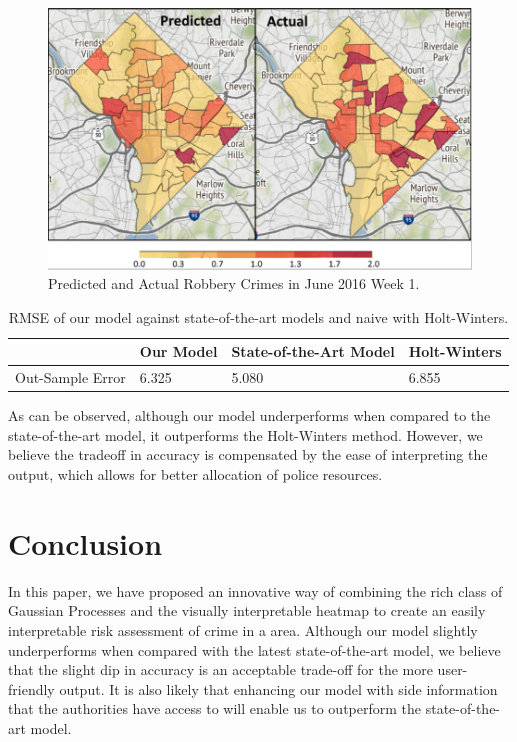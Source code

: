 \documentclass[a4paper, 10pt, conference]{ieeeconf}
\begin{document}
	\begin{figure}[!ht]
		\includegraphics[width=\linewidth]{./p2.png}
		\caption{Predicted and Actual Robbery Crimes in June 2016 Week 1.}
		\label{p2}
	\end{figure}

	\begin{table}[!ht]
		\begin{tabular}{| p{1cm} | l | p{2cm} | p{1.5cm} | }
		\hline
		& Our Model & State-of-the-Art Model & Holt-Winters \\ \hline
		Out-Sample Error & 6.325 & 5.080 & 6.855\\
		\hline
		\end{tabular}
		\caption{RMSE of our model against state-of-the-art models and naive with Holt-Winters.}
		\label{t2}
	\end{table}

	As can be observed, although our model underperforms when compared to the state-of-the-art model, it outperforms the Holt-Winters method.
	However, we believe the  tradeoff in accuracy is compensated by the ease of interpreting the output, which allows for better allocation of police resources.
	
	\section{Conclusion}
	In this paper, we have proposed an innovative way of combining the rich class of Gaussian Processes and the visually interpretable heatmap to create an easily interpretable risk assessment of crime in a area.
	Although our model slightly underperforms when compared with the latest state-of-the-art model, we believe that the slight dip in accuracy is an acceptable trade-off for the more user-friendly output.
	It is also likely that enhancing our model with side information that the authorities have access to will enable us to outperform the state-of-the-art model.
	
\end{document}
